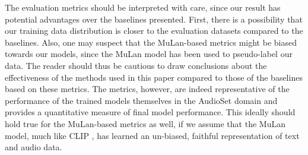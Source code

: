 The evaluation metrics should be interpreted with care, since our result has potential advantages over the baselines presented. First, there is a possibility that our training data distribution is closer to the evaluation datasets compared to the baselines. Also, one may suspect that the MuLan-based metrics might be biased towards our models, since the MuLan model has been used to pseudo-label our data. The reader should thus be cautious to draw conclusions about the effectiveness of the methods used in this paper compared to those of the baselines based on these metrics. The metrics, however, are indeed representative of the performance of the trained models themselves in the AudioSet domain and provides a quantitative measure of final model performance. This ideally should hold true for the MuLan-based metrics as well, if we assume that the MuLan model, much like CLIP \cite{radford2021learning}, has learned an un-biased, faithful representation of text and audio data.

\begin{table}[t!]
\vskip -0.05in
\caption{The FAD between the reference dataset audio and the generated audio with prompts from the reference dataset. Three audio encoders, VGG, Trill and MuLan have been used to measure FAD. A lower value indicates better proximity of quality.}
  \label{table:eval-FAD}
  \vskip 0.05in
  \centering
\vskip-0.15in
\end{table}

